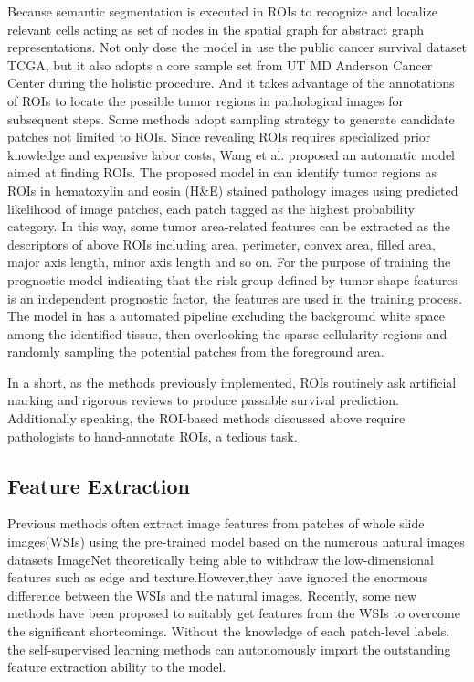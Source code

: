 \documentclass[journal,twoside,web]{ieeecolor}
\begin{document}
Because semantic segmentation is executed in ROIs to recognize and localize relevant cells acting as set of nodes in the spatial graph for abstract graph representations.
Not only dose the model in \cite{yao2017deep} use the public cancer survival dataset TCGA, but it also adopts a core sample set from UT MD Anderson Cancer Center during the holistic procedure.
And it takes advantage of the annotations of ROIs to locate the possible tumor regions in pathological images for subsequent steps.
Some methods adopt sampling strategy to generate candidate patches not limited to ROIs.
Since revealing ROIs requires specialized prior knowledge and expensive labor costs, Wang et al. proposed an automatic model aimed at finding ROIs.
The proposed model in \cite{wang2018comprehensive} can identify tumor regions as ROIs in hematoxylin and eosin (H\&E) stained pathology images using predicted likelihood of image patches, each patch tagged as the highest probability category. 
In this way, some tumor area-related features can be extracted as the descriptors of above ROIs including area, perimeter, convex area, filled area, major axis length, minor axis length and so on.
For the purpose of training the prognostic model indicating that the risk group defined by tumor shape features is an independent prognostic factor, the features are used in the training process.
The model in \cite{mackenzie2022neural} has a automated pipeline excluding the background white space among the identified tissue, then overlooking the sparse cellularity regions and randomly sampling the potential patches from the foreground area.

In a short, as the methods previously implemented, ROIs routinely ask artificial marking and rigorous reviews to produce passable survival prediction.
Additionally speaking, the ROI-based methods discussed above require pathologists to hand-annotate ROIs, a tedious task.
\subsection{Feature Extraction}
Previous methods often extract image features from patches of whole slide images(WSIs) using the pre-trained model based on the numerous natural images datasets ImageNet theoretically being able to withdraw the low-dimensional features such as edge and texture.However,they have ignored the enormous difference between the WSIs and the natural images.
Recently, some new methods have been proposed to suitably get features from the WSIs to overcome the significant shortcomings.
Without the knowledge of each patch-level labels, the self-supervised learning methods can autonomously impart the outstanding feature extraction ability to the model.
\end{document}
